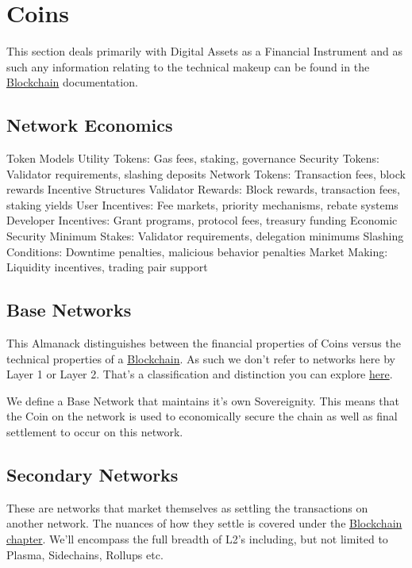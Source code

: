 \documentclass[
  letterpaper,
  DIV=11,
  numbers=noendperiod]{scrreprt}
\begin{document}
\section{Coins}\label{coins}

This section deals primarily with Digital Assets as a Financial
Instrument and as such any information relating to the technical makeup
can be found in the \href{../technical/blockchains.qmd}{Blockchain}
documentation.

\subsection{Network Economics}\label{network-economics}

Token Models Utility Tokens: Gas fees, staking, governance Security
Tokens: Validator requirements, slashing deposits Network Tokens:
Transaction fees, block rewards Incentive Structures Validator Rewards:
Block rewards, transaction fees, staking yields User Incentives: Fee
markets, priority mechanisms, rebate systems Developer Incentives: Grant
programs, protocol fees, treasury funding Economic Security Minimum
Stakes: Validator requirements, delegation minimums Slashing Conditions:
Downtime penalties, malicious behavior penalties Market Making:
Liquidity incentives, trading pair support

\subsection{Base Networks}\label{base-networks}

This Almanack distinguishes between the financial properties of Coins
versus the technical properties of a
\href{../technical/blockchains.qmd}{Blockchain}. As such we don't refer
to networks here by Layer 1 or Layer 2. That's a classification and
distinction you can explore \hyperref[layer-1]{here}.

We define a Base Network that maintains it's own Sovereignity. This
means that the Coin on the network is used to economically secure the
chain as well as final settlement to occur on this network.

\subsection{Secondary Networks}\label{secondary-networks}

These are networks that market themselves as settling the transactions
on another network. The nuances of how they settle is covered under the
\href{../technical/blockchains.qmd}{Blockchain chapter}. We'll encompass
the full breadth of L2's including, but not limited to Plasma,
Sidechains, Rollups etc.
\end{document}
